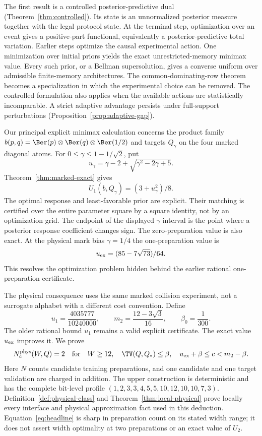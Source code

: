 The first result is a controlled posterior-predictive dual
(Theorem~\ref{thm:controlled}). Its state is an unnormalized posterior
measure together with the legal protocol state. At the terminal step,
optimization over an event gives a positive-part functional, equivalently
a posterior-predictive total variation. Earlier steps optimize the
causal experimental action. One minimization over initial priors yields
the exact unrestricted-memory minimax value. Every such prior, or a
Bellman supersolution, gives a converse uniform over admissible
finite-memory architectures. The common-dominating-row theorem becomes
a specialization in which the experimental choice can be removed.
The controlled formulation also applies when the available actions are
statistically incomparable. A strict adaptive advantage persists under
full-support perturbations (Proposition~\ref{prop:adaptive-gap}).

Our principal explicit minimax calculation concerns the product family
$b(p,q)=\Ber(p)\otimes\Ber(q)\otimes\Ber(1/2)$ and targets
$Q_\gamma$ on the four marked diagonal atoms. For
$0\le\gamma\le1-1/\sqrt2$, put
\[
 u_\gamma=\gamma-2+\sqrt{\gamma^2-2\gamma+5}.
\]
Theorem~\ref{thm:marked-exact} gives
\[
                 U_1(b,Q_\gamma)=(3+u_\gamma^2)/8.
\]
The optimal response and least-favorable prior are explicit. Their
matching is certified over the entire parameter square by a square
identity, not by an optimization grid. The endpoint of the displayed
$\gamma$ interval is the point where a posterior response coefficient
changes sign. The zero-preparation value is also exact. At the physical
mark bias $\gamma=1/4$ the one-preparation value is
\[
                   u_{\rm ex}=(85-7\sqrt{73})/64.
\]
This resolves the optimization problem hidden behind the earlier
rational one-preparation certificate.

The physical consequence uses the same marked collision experiment,
not a surrogate alphabet with a different cost convention. Define
\begin{equation}\label{eq:constants}
 u_1=\frac{4035777}{10240000},\qquad
 m_2=\frac{12-3\sqrt3}{16},\qquad \beta_0=\frac1{300}.
\end{equation}
The older rational bound $u_1$ remains a valid explicit certificate.
The exact value $u_{\rm ex}$ improves it. We prove
\begin{equation}\label{eq:headline}
 N_c^{\rm phys}(W,Q)=2\quad\text{for}\quad
 W\ge12,\quad\TV(Q,Q_*)\le\beta,\quad
 u_{\rm ex}+\beta\le c<m_2-\beta.
\end{equation}
Here $N$ counts candidate training preparations, and one candidate and
one target validation are charged in addition. The upper construction
is deterministic and has the complete bit-level profile
$(1,2,3,3,4,5,5,10,12,10,10,7,3)$.
Definition~\ref{def:physical-class} and Theorem~\ref{thm:local-physical}
prove locally every interface and physical approximation fact used in
this deduction. Equation~\eqref{eq:headline} is sharp in preparation
count on its stated width range; it does not assert width optimality
at two preparations or an exact value of $U_2$.

